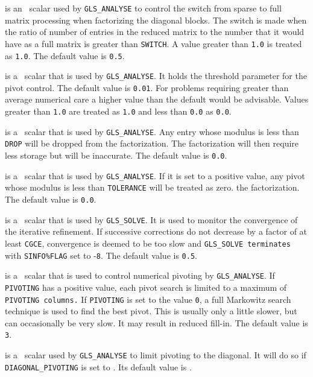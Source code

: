 \documentclass{galahad}
\newcommand{\packagename}{GLS}
\begin{document}
\begin{description}
 is an \realdp\ scalar used by {\tt \packagename\_ANALYSE} to 
control
the switch from sparse to full matrix processing when factorizing
the diagonal blocks.  The switch is made when the ratio of
number of entries in the reduced matrix to the number that it would
have as a full matrix is greater than {\tt SWITCH}.
A value greater than {\tt 1.0} is treated as {\tt 1.0}.
The default value is {\tt 0.5}.

 is a \realdp\ scalar that is used by  {\tt \packagename\_ANALYSE}.
It holds the threshold parameter for the pivot control.
The default value is {\tt 0.01}.  For problems requiring greater
than average numerical care a higher value than the default would be
advisable. Values greater than {\tt 1.0} are treated as {\tt 1.0} and 
less than {\tt 0.0} as {\tt 0.0}.

 is a \realdp\ scalar that is used by {\tt \packagename\_ANALYSE}.
Any entry whose modulus is less than
{\tt DROP} will be dropped from the factorization.
The factorization will then
require less storage but will be inaccurate.
The default value is {\tt 0.0}.

 is a \realdp\ scalar that is used by {\tt \packagename\_ANALYSE}.
If it is set to a positive value,
any pivot whose modulus is less than
{\tt TOLERANCE} will be treated as zero. 
the factorization.
The default value is {\tt 0.0}.

 is a \realdp\ scalar that is used by {\tt \packagename\_SOLVE}.
It is used to
monitor the convergence of the iterative refinement.  If successive
corrections do not decrease by a factor of at least {\tt CGCE},
convergence is deemed to be too slow and {\tt \packagename\_SOLVE
terminates} with {\tt SINFO\%FLAG} set to -{\tt 8}.
The default value is {\tt 0.5}.

 is a \integer\ scalar that is used to control numerical
pivoting by {\tt \packagename\_ANALYSE}. If {\tt PIVOTING} has a positive value,
each pivot search is limited to a maximum of {\tt PIVOTING
columns.}  If {\tt PIVOTING} is set to the value {\tt 0}, a full Markowitz search
technique is used to find the best pivot.  This is usually only a
little slower, but can occasionally be very slow.  It may result in
reduced fill-in. The default value is {\tt 3}.

 is a \logical\ scalar used by 
{\tt \packagename\_ANALYSE} to
limit pivoting to the diagonal.  It will do so if {\tt DIAGONAL\_PIVOTING} is set
to \true.  Its default value is \false.


\end{description}
\end{document}
